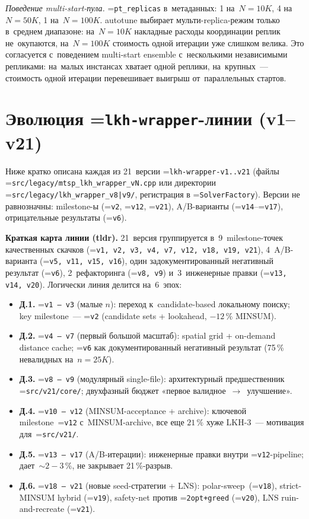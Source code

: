 \documentclass[a4paper,14pt]{extreport}
\makeatletter
\let\old@texttt\texttt
\renewcommand{\texttt}[1]{{\sloppy\hyphenchar\font=\m@ne\old@texttt{#1}}}
\makeatother
\begin{document}
\textit{Поведение multi-start-пула.} \texttt{pt\_replicas} в~метаданных: 1 на~$N=10K$, 4 на~$N=50K$, 1 на~$N=100K$. autotune выбирает мульти-replica-режим только в~среднем диапазоне: на~$N=10K$ накладные расходы координации реплик не~окупаются, на~$N=100K$ стоимость одной итерации уже слишком велика. Это согласуется с~поведением multi-start ensemble с~несколькими независимыми репликами: на~малых инстансах хватает одной реплики, на~крупных~--- стоимость одной итерации перевешивает выигрыш от~параллельных стартов.

\chapter{Эволюция \texttt{lkh-wrapper}-линии (v1--v21)}

Ниже кратко описана каждая из 21~версии \texttt{lkh-wrapper-v1..v21} (файлы \texttt{src/legacy/mtsp\_lkh\_wrapper\_vN.cpp} или директории \texttt{src/legacy/lkh\_wrapper\_v8|v9/}, регистрация в \texttt{SolverFactory}). Версии не равнозначны: milestone-ы (\texttt{v2}, \texttt{v12}, \texttt{v21}), A/B-варианты (\texttt{v14}--\texttt{v17}), отрицательные результаты (\texttt{v6}).

\medskip
\noindent\textbf{Краткая карта линии (tldr).} 21~версия группируется в~9~milestone-точек качественных скачков (\texttt{v1, v2, v3, v4, v7, v12, v18, v19, v21}), 4~A/B-варианта (\texttt{v5, v11, v15, v16}), один задокументированный негативный результат (\texttt{v6}), 2~рефакторинга (\texttt{v8, v9}) и~3~инженерные правки (\texttt{v13, v14, v20}). Логически линия делится на~6~эпох:
\begin{itemize}\setlength\itemsep{1pt}
\item \textbf{Д.1.} \texttt{v1\,--\,v3} (малые $n$): переход к~candidate-based локальному поиску; key milestone~--- \texttt{v2} (candidate sets + lookahead, $-12\,\%$ MINSUM).
\item \textbf{Д.2.} \texttt{v4\,--\,v7} (первый большой масштаб): spatial grid + on-demand distance cache; \texttt{v6} как документированный негативный результат (75\,\% невалидных на~$n=25K$).
\item \textbf{Д.3.} \texttt{v8\,--\,v9} (модулярный single-file): архитектурный предшественник \texttt{src/v21/core/}; двухфазный бюджет «первое валидное~$\to$~улучшение».
\item \textbf{Д.4.} \texttt{v10\,--\,v12} (MINSUM-acceptance + archive): ключевой milestone~\texttt{v12} с~MINSUM-archive, все еще $21\,\%$ хуже LKH-3~--- мотивация для~\texttt{src/v21/}.
\item \textbf{Д.5.} \texttt{v13\,--\,v17} (A/B-итерации): инженерные правки внутри \texttt{v12}-pipeline; дает~$\sim 2{-}3\,\%$, не закрывает 21\,\%-разрыв.
\item \textbf{Д.6.} \texttt{v18\,--\,v21} (новые seed-стратегии + LNS): polar-sweep~(\texttt{v18}), strict-MINSUM hybrid (\texttt{v19}), safety-net против \texttt{2opt+greed} (\texttt{v20}), LNS ruin-and-recreate (\texttt{v21}).
\end{itemize}
\end{document}
